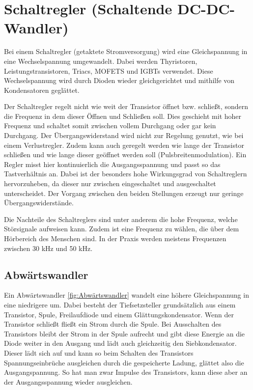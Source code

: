\section{Schaltregler (Schaltende DC-DC-Wandler)}

Bei einem Schaltregler (getaktete Stromversorgung) wird eine Gleichspannung in eine Wechselspannung umgewandelt. Dabei werden Thyristoren, Leistungstransistoren, Triacs, MOFETS und IGBTs verwendet. Diese Wechselspannung wird durch Dioden wieder gleichgerichtet und mithilfe von Kondensatoren geglättet. \cite{Ekbert:2014}

\bigskip

Der Schaltregler regelt nicht wie weit der Transistor öffnet bzw. schließt, sondern die Frequenz in dem dieser Öffnen und Schließen soll. Dies geschieht mit hoher Frequenz und schaltet somit zwischen vollem Durchgang oder gar kein Durchgang. Der Übergangswiderstand wird  nicht zur Regelung genutzt, wie bei einem Verlustregler. Zudem  kann auch geregelt werden wie lange der Transistor schließen und wie lange dieser geöffnet werden soll (Pulsbreitenmodulation). Ein Regler misst hier kontinuierlich die Ausgangsspannung und passt so das Tastverhältnis an. Dabei ist der besonders hohe Wirkungsgrad  von Schaltreglern hervorzuheben, da dieser nur zwischen eingeschaltet und ausgeschaltet unterscheidet. Der Vorgang zwischen den beiden Stellungen erzeugt nur geringe Übergangswiderstände. \cite{Ekbert:2014}

\bigskip

Die Nachteile des Schaltreglers sind unter anderem die hohe Frequenz, welche Störsignale aufweisen kann. Zudem ist eine Frequenz zu wählen, die über dem Hörbereich des Menschen sind. In der Praxis werden meistens Frequenzen zwischen 30 kHz und 50 kHz. \cite{Ekbert:2014}

\subsection{Abwärtswandler}

Ein Abwärtswandler \ref{fig:Abwärtswandler} wandelt eine höhere Gleichspannung in eine niedrigere um. Dabei besteht der Tiefsetzsteller grundsätzlich aus einem Transistor, Spule, Freilaufdiode und einem Glättungskondensator. Wenn der Transistor schließt fließt ein Strom durch die Spule. Bei Ausschalten des Transistors bleibt der Strom in der Spule aufrecht und gibt diese Energie an die Diode weiter in den Ausgang und lädt auch gleichzeitig den Siebkondensator. Dieser lädt sich auf und kann so beim Schalten des Transistors Spannungseinbrüche ausgleichen durch die gespeicherte Ladung, glättet also die Ausgangspannung. So hat man zwar Impulse des Transistors, kann diese aber an der Ausgangsspannung wieder ausgleichen.  

